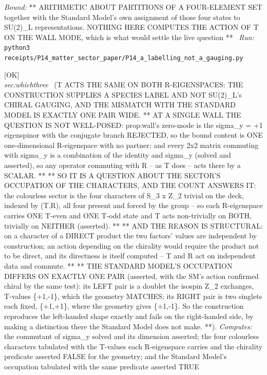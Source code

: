 \begin{description}
 \emph{Bound:} ** ARITHMETIC ABOUT PARTITIONS OF A FOUR-ELEMENT SET together with the Standard Model's own assignment of those four states to SU(2)\_L representations. NOTHING HERE COMPUTES THE ACTION OF T ON THE WALL MODE, which is what would settle the live question **
\ \emph{Run:} \texttt{python3 receipts/P14\_matter\_sector\_paper/P14\_a\_labelling\_not\_a\_gauging.py}
\item[\label{rcpt:P14_the_species_bit_is_not_chiral}\texttt{P14\_the\_species\_bit\_is\_not\_chiral}]\hfill\textsf{[OK]}\\
\textit{sec:whichthree} \ (T ACTS THE SAME ON BOTH R-EIGENSPACES: THE CONSTRUCTION SUPPLIES A SPECIES LABEL AND NOT SU(2)\_L's CHIRAL GAUGING, AND THE MISMATCH WITH THE STANDARD MODEL IS EXACTLY ONE PAIR WIDE. ** AT A SINGLE WALL THE QUESTION IS NOT WELL-POSED: prop:wall's zero-mode is the sigma\_y = +1 eigenspinor with the conjugate branch REJECTED, so the bound content is ONE one-dimensional R-eigenspace with no partner; and every 2x2 matrix commuting with sigma\_y is a combination of the identity and sigma\_y (solved and asserted), so any operator commuting with R -- as T does -- acts there by a SCALAR. ** ** SO IT IS A QUESTION ABOUT THE SECTOR'S OCCUPATION OF THE CHARACTERS, AND THE COUNT ANSWERS IT: the colourless sector is the four characters of S\_3 x Z\_2 trivial on the deck, indexed by (T,R), all four present and forced by the group -- so each R-eigenspace carries ONE T-even and ONE T-odd state and T acts non-trivially on BOTH, trivially on NEITHER (asserted). ** ** AND THE REASON IS STRUCTURAL: on a character of a DIRECT product the two factors' values are independent by construction; an action depending on the chirality would require the product not to be direct, and its directness is itself computed -- T and R act on independent data and commute. ** ** THE STANDARD MODEL'S OCCUPATION DIFFERS ON EXACTLY ONE PAIR (asserted, with the SM's action confirmed chiral by the same test): its LEFT pair is a doublet the isospin Z\_2 exchanges, T-values \{+1,-1\}, which the geometry MATCHES; its RIGHT pair is two singlets each fixed, \{+1,+1\}, where the geometry gives \{+1,-1\}. So the construction reproduces the left-handed shape exactly and fails on the right-handed side, by making a distinction there the Standard Model does not make. **). 
\emph{Computes:} the commutant of sigma\_y solved and its dimension asserted; the four colourless characters tabulated with the T-values each R-eigenspace carries and the chirality predicate asserted FALSE for the geometry; and the Standard Model's occupation tabulated with the same predicate asserted TRUE

\end{description}
